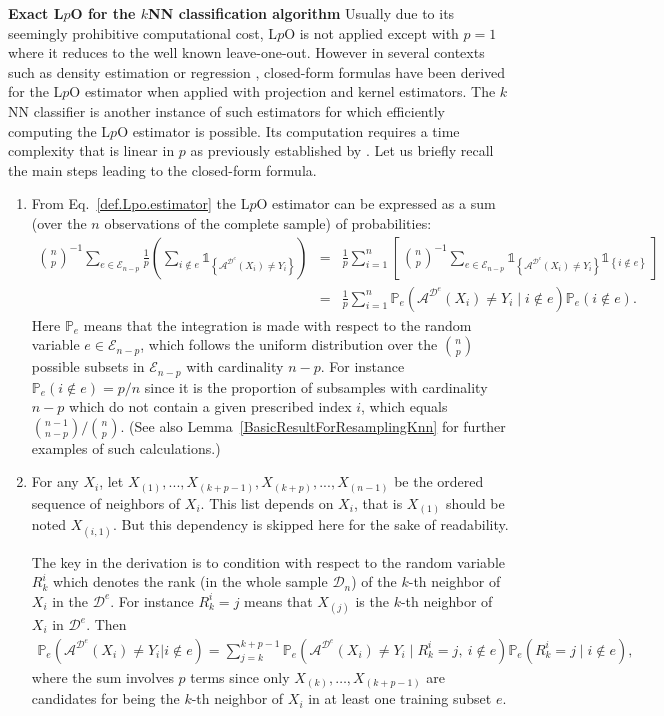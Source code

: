 \documentclass[twoside,11pt]{article}
\numberwithin{equation}{section}
\newcommand{\gp}[1]{\left(#1\right)}
\newcommand{\ga}[1]{\left\{#1\right\}}
\newcommand{\1}{\mathds{1}}%
\newcommand{\ind}[1]{\1_{\ga{#1}}}%
\newcommand{\paren}[1]{\left( #1 \right)}
\newcommand{\croch}[1]{\left[\, #1 \,\right]}
\renewcommand{\P}{\mathbb{P}}
\newcommand{\D}{\mathcal{D}}
\newcommand{\De}{\mathcal{D}^e}
\newcommand{\A}{\mathcal{A}}
\numberwithin{equation}{section}
\theoremstyle{plain}
\begin{document}
\noindent\textbf{Exact L$p$O for the $k$NN classification algorithm}
%
Usually due to its seemingly prohibitive computational cost, L$p$O is not
applied except with $p = 1$ where it reduces to the well known leave-one-out.
%
 {However in several contexts such as density estimation \citep{CeRo08,Celi_2014} or regression \citep{Cel:2008:phd}, closed-form formulas have been derived for the L$p$O estimator when applied with projection and kernel estimators.}
%
The $k$NN classifier is another instance of such estimators for which efficiently computing the L$p$O estimator is possible. Its computation requires a time complexity that is linear in $p$ as previously established by \cite{CelisseMaryHuard11}.
%
Let us briefly recall the main steps leading to the closed-form formula.
\begin{enumerate}
\item From Eq.~\eqref{def.Lpo.estimator} the L$p$O estimator can be expressed as a sum (over the $n$ observations of the complete sample) of probabilities:
\begin{eqnarray*}
{n\choose p}^{-1}\sum_{e\in \mathcal{E}_{n-p}}\frac{1}{p} \paren{ \sum_{i \notin e} \ind{ \A^{\De}\gp{X_i}\neq Y_i} } &=& \frac{1}{p}\sum_{i=1}^n \croch{ {n\choose p}^{-1}\sum_{e\in\mathcal{E}_{n-p}} \ind{ \A^{\De}\gp{X_i}\neq Y_i} \ind{ i \notin e} } \\
%
&=& \frac{1}{p}\sum_{i=1}^n \P_e(\A^{\De}\gp{X_i} \neq Y_i \mid i \notin e)\P_e( i \notin e) .
\end{eqnarray*}
Here $\P_e$ means that the integration is made with respect to the random variable $e \in \mathcal{E}_{n-p}$, which follows the uniform distribution over the ${n\choose p}$ possible subsets in $\mathcal{E}_{n-p}$ with cardinality $n-p$.
%
For instance $\P_e( i \notin e) = p/n$ since it is the proportion of subsamples with cardinality $n-p$ which do not contain a given prescribed index $i$, which equals ${n-1\choose n-p}/{n\choose p}$. (See also Lemma~\ref{BasicResultForResamplingKnn} for further examples of such calculations.)



\item For any $X_i$, let $X_{(1)},...,X_{(k+p-1)},X_{(k+p)},...,X_{(n-1)}$ be the ordered sequence of neighbors of $X_i$.
%
This list depends on $X_i$, that is $X_{(1)}$ should be noted $X_{(i,1)}$. But this dependency is skipped here for the sake of readability.

The key in the derivation is to condition with respect to the random variable $R_{k}^i$ which denotes the rank (in the whole sample $\D_n$) of the  {$k$-th} neighbor of $X_i$ in the $\De$. For instance $R_k^i=j$ means that $X_{(j)}$ is the $k$-th neighbor of $X_i$ in $\De$.
%
Then
\begin{eqnarray*}
\P_e(\A^{\De}\gp{X_i} \neq Y_i|i \notin e) = \sum_{j=k}^{k+p-1} \P_e(\A^{\De}\gp{X_i}\neq Y_i \mid R_k^i=j, \ i \notin e)\P_e(R_k^i=j \mid i \notin e) ,
\end{eqnarray*}
where the sum involves $p$ terms since only $X_{(k)},\dots,X_{(k+p-1)}$ are candidates for being the $k$-th neighbor of $X_i$ in at least one training subset $e$.


\end{enumerate}
\end{document}
